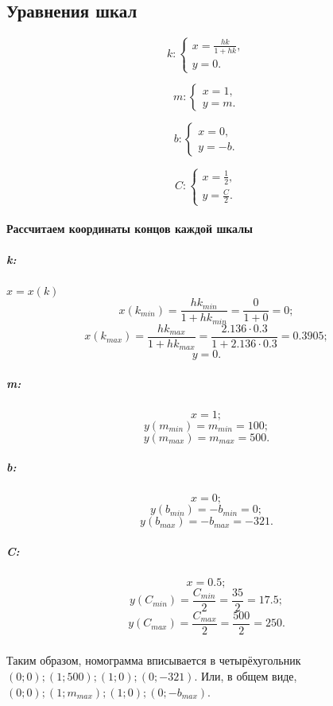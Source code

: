 \subsection{Уравнения шкал}

$$k: \left\{
\begin{array}{l}
	x = \frac{hk}{1+hk},\\
	y = 0.
\end{array}
\right.
$$

$$m: \left\{
\begin{array}{l}
	x = 1,\\
	y = m.
\end{array}
\right.
$$

$$b: \left\{
\begin{array}{l}
	x = 0,\\
	y = -b.
\end{array}
\right.
$$

$$
C: \left\{
\begin{array}{l}
	x = \frac{1}{2}, \\
	y = \frac{C}{2}.
\end{array}
\right.
$$

\paragraph{Рассчитаем координаты концов каждой шкалы}
\subparagraph{k:}
$x = x(k)$
$$x(k_{min}) = \frac{hk_{min}}{1+hk_{min}} = \frac{0}{1+0} = 0;$$
$$x(k_{max}) = \frac{h k_{max}}{1+h k_{max}} = \frac{2.136 \cdot 0.3}{1 + 2.136 \cdot 0.3} = 0.3905;$$
$$y = 0.$$

\subparagraph{m:}
$$x = 1;$$
$$y(m_{min}) = m_{min} = 100;$$
$$y(m_{max}) = m_{max} = 500.$$

\subparagraph{b:}
$$x = 0;$$
$$y(b_{min}) = -b_{min} = 0;$$
$$y(b_{max}) = -b_{max} = -321.$$

\subparagraph{C:}
$$x = 0.5;$$
$$y(C_{min}) = \frac{C_{min}}{2} = \frac{35}{2} = 17.5;$$
$$y(C_{max}) = \frac{C_{max}}{2} = \frac{500}{2} = 250.$$

\subparagraph{}Таким образом, номограмма вписывается в четырёхугольник $(0; 0); (1; 500); (1; 0); (0; -321)$.
Или, в общем виде, $(0; 0); (1; m_{max}); (1; 0); (0; -b_{max})$.